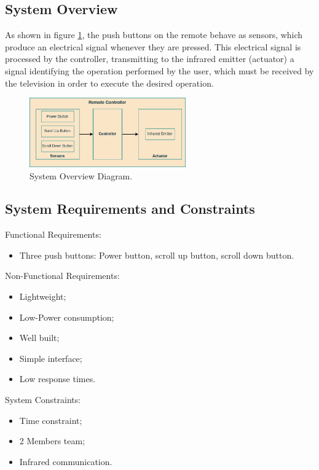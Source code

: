 \documentclass[12pt, letterpaper]{report}
\begin{document}
\subsection{System Overview}
As shown in figure \ref{fig:sys_overview}, the push buttons on the remote behave as sensors, which produce an electrical signal whenever they are pressed. This electrical signal is processed by the controller, transmitting to the infrared emitter (actuator) a signal identifying the operation performed by the user, which must be received by the television in order to execute the desired operation.

\begin{figure}[ht]
	\centering
	\includegraphics[width=0.60\textwidth]{SysOverview}
	\caption{System Overview Diagram.}
	\label{fig:sys_overview}
\end{figure}

\subsection{System Requirements and Constraints}

Functional Requirements:

\begin{itemize}
    \item Three push buttons: Power button, scroll up button, scroll down button.\\
\end{itemize}

Non-Functional Requirements:
\begin{itemize}
    \item Lightweight;
    \item Low-Power consumption;
    \item Well built;
    \item Simple interface;
    \item Low response times.\\
\end{itemize}

System Constraints:
\begin{itemize}
    \item Time constraint;
    \item 2 Members team;
    \item Infrared communication.\\
\end{itemize}
\end{document}
